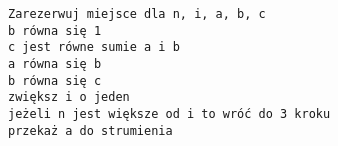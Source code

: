 \begin{verbatim}
Zarezerwuj miejsce dla n, i, a, b, c
b równa się 1 
c jest równe sumie a i b
a równa się b
b równa się c 
zwiększ i o jeden
jeżeli n jest większe od i to wróć do 3 kroku
przekaż a do strumienia
\end{verbatim}